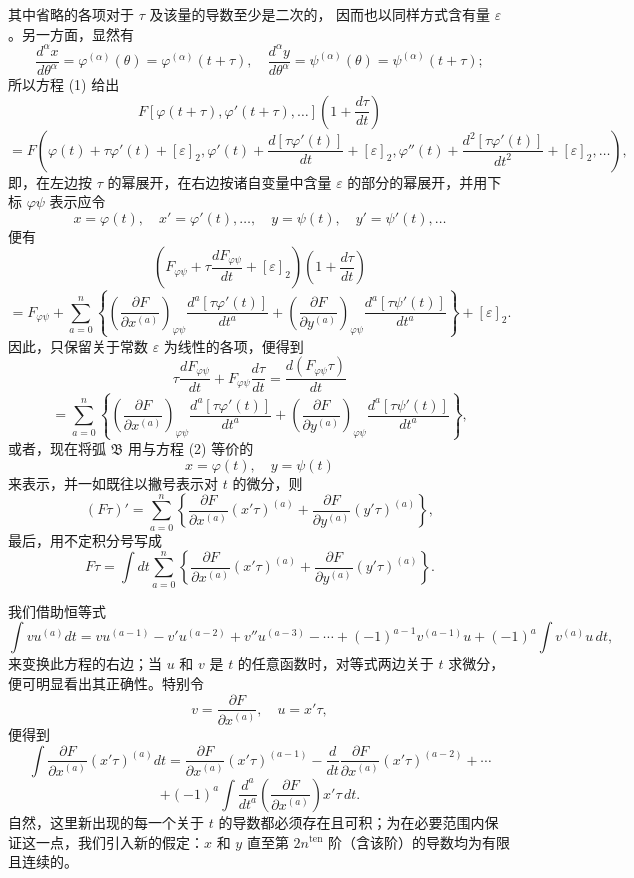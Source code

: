\documentclass[11pt,a4paper,leqno]{article}
\begin{document}
其中省略的各项对于 $\tau$ 及该量的导数至少是二次的，
因而也以同样方式含有量 $\varepsilon$。另一方面，显然有
\[
\frac{d^\alpha x}{d\theta^\alpha}=\varphi^{(\alpha)}(\theta)=\varphi^{(\alpha)}(t+\tau),
\quad
\frac{d^\alpha y}{d\theta^\alpha}=\psi^{(\alpha)}(\theta)=\psi^{(\alpha)}(t+\tau);
\]
所以方程 (1) 给出
\[
F[\varphi(t+\tau),\varphi'(t+\tau),\ldots]\left(1+\frac{d\tau}{dt}\right)
\]
\[
=F\left(\varphi(t)+\tau\varphi'(t)+[\varepsilon]_2,
\varphi'(t)+\frac{d[\tau\varphi'(t)]}{dt}+[\varepsilon]_2,
\varphi''(t)+\frac{d^2[\tau\varphi'(t)]}{dt^2}+[\varepsilon]_2,\ldots\right),
\]
即，在左边按 $\tau$ 的幂展开，在右边按诸自变量中含量 $\varepsilon$ 的部分的幂展开，并用下标 $\varphi\psi$ 表示应令
\[
x=\varphi(t),\quad x'=\varphi'(t),\ldots,
\quad y=\psi(t),\quad y'=\psi'(t),\ldots
\]
便有
\[
\left(F_{\varphi\psi}+\tau\frac{dF_{\varphi\psi}}{dt}+[\varepsilon]_2\right)\left(1+\frac{d\tau}{dt}\right)
\]
\[
=F_{\varphi\psi}+\sum_{a=0}^n\left\{\left(\frac{\partial F}{\partial x^{(a)}}\right)_{\varphi\psi}\frac{d^a[\tau\varphi'(t)]}{dt^a}
+\left(\frac{\partial F}{\partial y^{(a)}}\right)_{\varphi\psi}\frac{d^a[\tau\psi'(t)]}{dt^a}\right\}+[\varepsilon]_2.
\]
因此，只保留关于常数 $\varepsilon$ 为线性的各项，便得到
\[
\tau\frac{dF_{\varphi\psi}}{dt}+F_{\varphi\psi}\frac{d\tau}{dt}
=\frac{d(F_{\varphi\psi}\tau)}{dt}
\]
\[
=\sum_{a=0}^n\left\{\left(\frac{\partial F}{\partial x^{(a)}}\right)_{\varphi\psi}\frac{d^a[\tau\varphi'(t)]}{dt^a}
+\left(\frac{\partial F}{\partial y^{(a)}}\right)_{\varphi\psi}\frac{d^a[\tau\psi'(t)]}{dt^a}\right\},
\]
或者，现在将弧 $\mathfrak B$ 用与方程 (2) 等价的
\[
x=\varphi(t),\quad y=\psi(t)
\]
来表示，并一如既往以撇号表示对 $t$ 的微分，则
\[
(F\tau)'=\sum_{a=0}^n\left\{\frac{\partial F}{\partial x^{(a)}}(x'\tau)^{(a)}+\frac{\partial F}{\partial y^{(a)}}(y'\tau)^{(a)}\right\},
\]
最后，用不定积分号写成
\begin{equation}\tag{3}
F\tau=\int dt\sum_{a=0}^n\left\{\frac{\partial F}{\partial x^{(a)}}(x'\tau)^{(a)}+\frac{\partial F}{\partial y^{(a)}}(y'\tau)^{(a)}\right\}.
\end{equation}

我们借助恒等式
\[
\int vu^{(a)}dt=vu^{(a-1)}-v'u^{(a-2)}+v''u^{(a-3)}-\cdots
+(-1)^{a-1}v^{(a-1)}u+(-1)^a\int v^{(a)}u\,dt,
\]
来变换此方程的右边；当 $u$ 和 $v$ 是 $t$ 的任意函数时，对等式两边关于 $t$ 求微分，便可明显看出其正确性。特别令
\[
v=\frac{\partial F}{\partial x^{(a)}},\quad u=x'\tau,
\]
便得到
\[
\int\frac{\partial F}{\partial x^{(a)}}(x'\tau)^{(a)}dt
=\frac{\partial F}{\partial x^{(a)}}(x'\tau)^{(a-1)}
-\frac{d}{dt}\frac{\partial F}{\partial x^{(a)}}(x'\tau)^{(a-2)}+\cdots
\]
\[
+(-1)^a\int\frac{d^a}{dt^a}\left(\frac{\partial F}{\partial x^{(a)}}\right)x'\tau\,dt.
\]
自然，这里新出现的每一个关于 $t$ 的导数都必须存在且可积；为在必要范围内保证这一点，我们引入新的假定：$x$ 和 $y$ 直至第 $2n^{\mathrm{ten}}$ 阶（含该阶）的导数均为有限且连续的。
\end{document}
